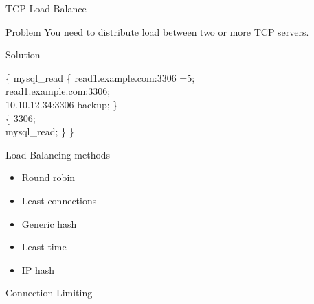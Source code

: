 \documentclass{beamer}
\begin{document}
\begin{frame}{TCP Load Balance}
\begin{minipage}[t]{0.8\textwidth}
	\begin{block}{Problem}
		\vspace{0.02\textheight}
		You need to distribute load between two or more TCP servers.
	\end{block}
	
	\begin{block}{Solution}
		\vspace{0.02\textheight}
		\scriptsize
		\begin{Alms*}
			 \{ \NI
			 mysql\_read \{ \NI
			 read1.example.com:3306	=5; \\
			 read1.example.com:3306; 	\\
			 10.10.12.34:3306		backup;
			\ND \} \\
			 \{ \NI
			 3306; \\
			 mysql\_read;
			\ND \}
			\ND \}
		\end{Alms*}
	\end{block}
\end{minipage}
\end{frame}

\begin{frame}{Load Balancing methods}
\begin{itemize}
	\item Round robin
	\item Least connections
	\item Generic hash
	\item Least time
	\item IP hash
\end{itemize}
\end{frame}


\begin{frame}{Connection Limiting}

\end{frame}
\end{document}

